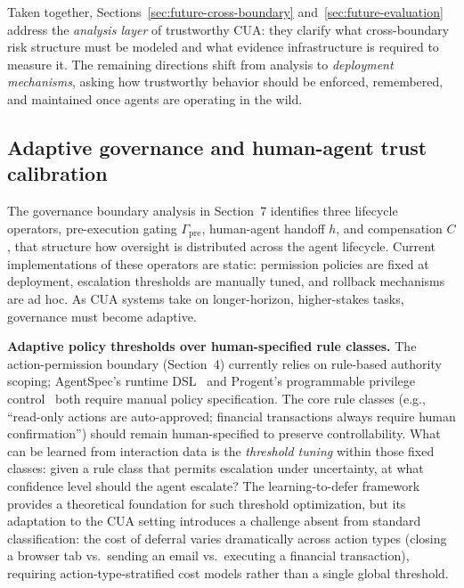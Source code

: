 Taken together, Sections~\ref{sec:future-cross-boundary} and~\ref{sec:future-evaluation} address the \emph{analysis layer} of trustworthy CUA: they clarify what cross-boundary risk structure must be modeled and what evidence infrastructure is required to measure it. The remaining directions shift from analysis to \emph{deployment mechanisms}, asking how trustworthy behavior should be enforced, remembered, and maintained once agents are operating in the wild.

\subsection{Adaptive governance and human-agent trust calibration}
\label{sec:future-governance}

The governance boundary analysis in Section~7 identifies three lifecycle operators, pre-execution gating $\Gamma_{\text{pre}}$, human-agent handoff $h$, and compensation $C$, that structure how oversight is distributed across the agent lifecycle. Current implementations of these operators are static: permission policies are fixed at deployment, escalation thresholds are manually tuned, and rollback mechanisms are ad hoc. As CUA systems take on longer-horizon, higher-stakes tasks, governance must become adaptive.

\smallskip
\noindent\textbf{Adaptive policy thresholds over human-specified rule classes.}
The action-permission boundary (Section~4) currently relies on rule-based authority scoping; AgentSpec's runtime DSL~\cite{agentspec2025} and Progent's programmable privilege control~\cite{progent2025} both require manual policy specification. The core rule classes (e.g., ``read-only actions are auto-approved; financial transactions always require human confirmation'') should remain human-specified to preserve controllability. What can be learned from interaction data is the \emph{threshold tuning} within those fixed classes: given a rule class that permits escalation under uncertainty, at what confidence level should the agent escalate? The learning-to-defer framework~\cite{madras2018predict} provides a theoretical foundation for such threshold optimization, but its adaptation to the CUA setting introduces a challenge absent from standard classification: the cost of deferral varies dramatically across action types (closing a browser tab vs.\ sending an email vs.\ executing a financial transaction), requiring action-type-stratified cost models rather than a single global threshold.

